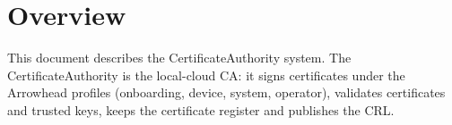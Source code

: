 \documentclass[a4paper]{arrowhead}
\begin{document}
\sloppy

\ArrowheadSetup

\begin{center}
  \vspace*{1cm}
  \huge{\arrowtitle}

  \vspace*{0.2cm}
  \LARGE{\arrowtype}
  \vspace*{1cm}

  \vspace*{\fill}


  \vspace*{1cm}
  \vspace*{\fill}

  \begin{abstract}
    This document describes the CertificateAuthority support system of the Eclipse Arrowhead 5.2.2 framework, as implemented in \texttt{ah5-CertificateAuthority-java-spring} with an independent local-cloud deployment definition in its own folder.
  \end{abstract}

  \vspace*{1cm}
\end{center}

\newpage

\tableofcontents
\newpage

\section{Overview}
\label{sec:overview}

This document describes the CertificateAuthority system. The Certificate\allowbreak{}Authority is the local-cloud CA: it signs certificates under the Arrowhead profiles (onboarding, device, system, operator), validates certificates and trusted keys, keeps the certificate register and publishes the CRL.
\end{document}
